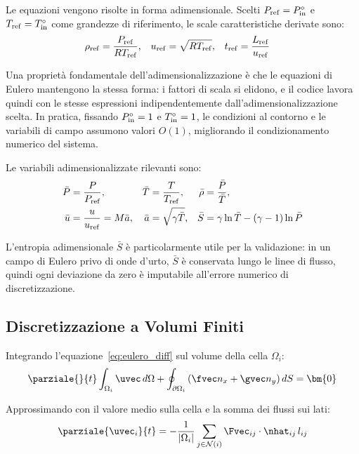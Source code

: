 Le equazioni vengono risolte in forma adimensionale. Scelti $P_{\rm ref} = P^\circ_{\rm in}$
e $T_{\rm ref} = T^\circ_{\rm in}$ come grandezze di riferimento, le scale caratteristiche
derivate sono:
\begin{align*}
  \rho_{\rm ref} &= \frac{P_{\rm ref}}{R T_{\rm ref}}, &
  u_{\rm ref} &= \sqrt{R T_{\rm ref}}, &
  t_{\rm ref} &= \frac{L_{\rm ref}}{u_{\rm ref}}
\end{align*}

Una proprietà fondamentale dell'adimensionalizzazione è che le equazioni di Eulero mantengono
la stessa forma: i fattori di scala si elidono, e il codice lavora quindi con le stesse
espressioni indipendentemente dall'adimensionalizzazione scelta. In pratica, fissando
$P^\circ_{\rm in} = 1$ e $T^\circ_{\rm in} = 1$, le condizioni al contorno e le variabili
di campo assumono valori $O(1)$, migliorando il condizionamento numerico del sistema.

Le variabili adimensionalizzate rilevanti sono:
\begin{align}
  \bar{P} &= \frac{P}{P_{\rm ref}}, & \bar{T} &= \frac{T}{T_{\rm ref}}, &
  \bar{\rho} &= \frac{\bar{P}}{\bar{T}}, \\
  \bar{u} &= \frac{u}{u_{\rm ref}} = M \bar{a}, &
  \bar{a} &= \sqrt{\gamma \bar{T}}, &
  \bar{S} &= \gamma \ln \bar{T} - (\gamma-1)\ln \bar{P}
\end{align}

L'entropia adimensionale $\bar{S}$ è particolarmente utile per la validazione: in un campo
di Eulero privo di onde d'urto, $\bar{S}$ è conservata lungo le linee di flusso, quindi
ogni deviazione da zero è imputabile all'errore numerico di discretizzazione.

\subsection{Discretizzazione a Volumi Finiti}

Integrando l'equazione~\eqref{eq:eulero_diff} sul volume della cella $\Omega_i$:
\begin{equation}
  \parziale{}{t} \int_{\Omega_i} \uvec \, d\Omega
  + \oint_{\partial\Omega_i} \left(\fvec n_x + \gvec n_y\right) dS = \bm{0}
\end{equation}

Approssimando con il valore medio sulla cella e la somma dei flussi sui lati:
\begin{equation}
  \parziale{\uvec_i}{t} = -\frac{1}{|\Omega_i|}\sum_{j \in \mathcal{N}(i)}
    \Fvec_{ij} \cdot \nhat_{ij} \, l_{ij}
  \label{eq:volumi_finiti}
\end{equation}

